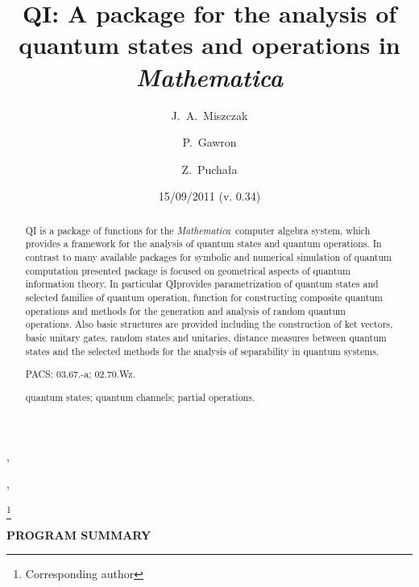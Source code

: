 \documentclass[a4paper,11pt]{elsart}
\newcommand{\Mathematica}{\emph{Mathematica}}
\newcommand{\1}{{\rm 1\hspace{-0.9mm}l}}
\newcommand{\qi}{QI}
\begin{document}
\begin{frontmatter}



\title{\qi: A package for the analysis of quantum states and operations in
\Mathematica}

\date{15/09/2011 (v. 0.34)}

\author{J.~A.~Miszczak},
\author{P.~Gawron},
\author{Z.~Pucha{\l}a}

\thanks[author]{Corresponding author}

\address{Institute of Theoretical and Applied Informatics, Polish Academy of 
Sciences, Ba{\l}tycka 5, 44-100 Gliwice, Poland}

\begin{abstract}
QI is a package of functions for the \Mathematica\ computer algebra system,
which provides a framework for the analysis of quantum states and quantum
operations. In contrast to many available packages for symbolic and numerical
simulation of quantum computation presented package is focused on geometrical
aspects of quantum information theory. In particular \qi provides
parametrization of quantum states and selected families of quantum operation,
function for constructing composite quantum operations and methods for the
generation and analysis of random quantum operations. Also basic structures are
provided including the construction of ket vectors, basic unitary gates, random
states and unitaries, distance measures between quantum states and the selected
methods for the analysis of separability in quantum systems.

\begin{flushleft}
PACS: 03.67.-a; 02.70.Wz.
\end{flushleft}

\begin{keyword}
quantum states; quantum channels; partial operations.
\end{keyword}
\end{abstract}

\end{frontmatter}
{\bf PROGRAM SUMMARY}
\end{document}
